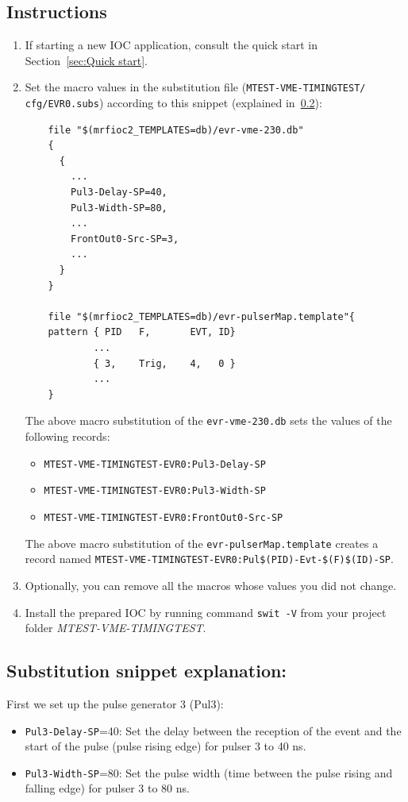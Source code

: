 \documentclass[12pt,a4paper]{article}
\begin{document}
\subsection{Instructions}
\begin{enumerate}
	\item If starting a new IOC application, consult the quick start in Section~\ref{sec:Quick start}.

	\item Set the macro values in the substitution file (\texttt{MTEST-VME-TIMINGTEST/} \texttt{cfg/EVR0.subs}) according to this snippet (explained in~\ref{sec:explain_pulser}):
\begin{verbatim}
	file "$(mrfioc2_TEMPLATES=db)/evr-vme-230.db"
	{
	  {
	    ...
	    Pul3-Delay-SP=40,
	    Pul3-Width-SP=80,
	    ...
	    FrontOut0-Src-SP=3,
	    ...
	  }
	}

	file "$(mrfioc2_TEMPLATES=db)/evr-pulserMap.template"{
	pattern { PID   F,       EVT, ID}
	        ...
	        { 3,    Trig,    4,   0 }
	        ...
	}
\end{verbatim}
	The above macro substitution of the \texttt{evr-vme-230.db} sets the values of the following records:
	\begin{itemize}
	\item \texttt{MTEST-VME-TIMINGTEST-EVR0:Pul3-Delay-SP}
	\item \texttt{MTEST-VME-TIMINGTEST-EVR0:Pul3-Width-SP}
	\item \texttt{MTEST-VME-TIMINGTEST-EVR0:FrontOut0-Src-SP}
	\end{itemize}
	The above macro substitution of the \texttt{evr-pulserMap.template} creates a record named \texttt{MTEST-VME-TIMINGTEST-EVR0:Pul\$(PID)-Evt-\$(F)\$(ID)-SP}.
	\item Optionally, you can remove all the macros whose values you did not change. 
	\item Install the prepared IOC by running command \texttt{swit -V} from your project folder \textit{MTEST-VME-TIMINGTEST}.
\end{enumerate}
\subsection{Substitution snippet explanation:}\label{sec:explain_pulser}

First we set up the pulse generator 3 (Pul3):
\begin{itemize}
	\item \texttt{Pul3-Delay-SP}=40: Set the delay between the reception of the event and the start of the pulse (pulse rising edge) for pulser 3 to 40 ns. 
	\item \texttt{Pul3-Width-SP}=80: Set the pulse width (time between the pulse rising and falling edge) for pulser 3 to 80 ns.
\end{itemize}
\end{document}
